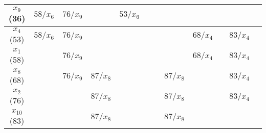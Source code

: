 \documentclass[12pt]{article}
\begin{document}
\begin{enumerate}
\begin{tabular}{|c|c|c|c|c|c|c|c|c|c|c|c|}
$x_9$ (36)    & $58/x_{6}$                        & $76/x_{9}$                        &                                   & {\color[HTML]{FE0000} $53/x_{6}$} &                                    &                                    &                                   &                                   &                                    &                                   &                          \\ \hline
$x_4$ (53)    & {\color[HTML]{FE0000} $58/x_{6}$} & $76/x_{9}$                        &                                   &                                   &                                    &                                    &                                   & $68/x_{4}$                        &                                    & $83/x_{4}$                        &                          \\ \hline
$x_1$ (58)    &                                   & $76/x_{9}$                        &                                   &                                   &                                    &                                    &                                   & {\color[HTML]{FE0000} $68/x_{4}$} &                                    & $83/x_{4}$                        &                          \\ \hline
$x_8$ (68)    &                                   & {\color[HTML]{FE0000} $76/x_{9}$} & $87/x_{8}$                        &                                   &                                    &                                    & $87/x_{8}$                        &                                   &                                    & $83/x_{4}$                        &                          \\ \hline
$x_2$ (76)    &                                   &                                   & $87/x_{8}$                        &                                   &                                    &                                    & $87/x_{8}$                        &                                   &                                    & {\color[HTML]{FE0000} $83/x_{4}$} &                          \\ \hline
$x_{10}$ (83) &                                   &                                   & {\color[HTML]{FE0000} $87/x_{8}$} &                                   &                                    &                                    & $87/x_{8}$                        &                                   &                                    &                                   &                          \\ \hline

\end{tabular}
\end{enumerate}
\end{document}
